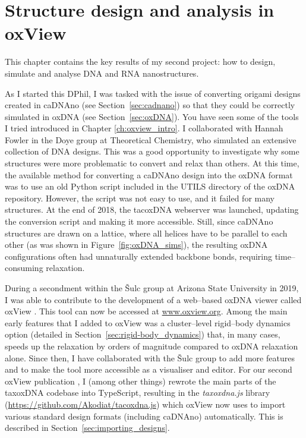 \chapter{\label{ch:oxview}Structure design and analysis in oxView}

\minitoc


This chapter contains the key results of my second project: how to design, simulate and analyse DNA and RNA nanostructures.

As I started this DPhil, I was tasked with the issue of converting origami designs created in caDNAno (see Section~\ref{sec:cadnano}) so that they could be correctly simulated in oxDNA (see Section~\ref{sec:oxDNA}). You have seen some of the tools I tried introduced in Chapter \ref{ch:oxview_intro}. I collaborated with Hannah Fowler in the Doye group at Theoretical Chemistry, who simulated an extensive collection of DNA designs. This was a good opportunity to investigate why some structures were more problematic to convert and relax than others. At this time, the available method for converting a caDNAno design into the oxDNA format was to use an old Python script included in the UTILS directory of the oxDNA repository. However, the script was not easy to use, and it failed for many structures. At the end of 2018, the tacoxDNA webserver \cite{suma2019tacoxdna} was launched, updating the conversion script and making it more accessible. Still, since caDNAno structures are drawn on a lattice, where all helices have to be parallel to each other (as was shown in Figure~\ref{fig:oxDNA_sims}), the resulting oxDNA configurations often had unnaturally extended backbone bonds, requiring time--consuming relaxation.

During a secondment within the {\v{S}}ulc group at Arizona State University in 2019, I was able to contribute to the development of a web--based oxDNA viewer called oxView \cite{poppleton2020design, bohlin2022oxview}. This tool can now be accessed at {\large\url{www.oxview.org}}. Among the main early features that I added to oxView was a cluster--level rigid--body dynamics option (detailed in Section~\ref{sec:rigid-body_dynamics}) that, in many cases, speeds up the relaxation by orders of magnitude compared to oxDNA relaxation alone. Since then, I have collaborated with the {\v{S}}ulc group to add more features and to make the tool more accessible as a visualiser and editor. For our second oxView publication \cite{bohlin2022oxview}, I (among other things) rewrote the main parts of the taxoxDNA codebase into TypeScript, resulting in the \emph{taxoxdna.js} library (\url{https://github.com/Akodiat/tacoxdna.js}) which oxView now uses to import various standard design formats (including caDNAno) automatically. This is described in Section~\ref{sec:importing_designs}.

